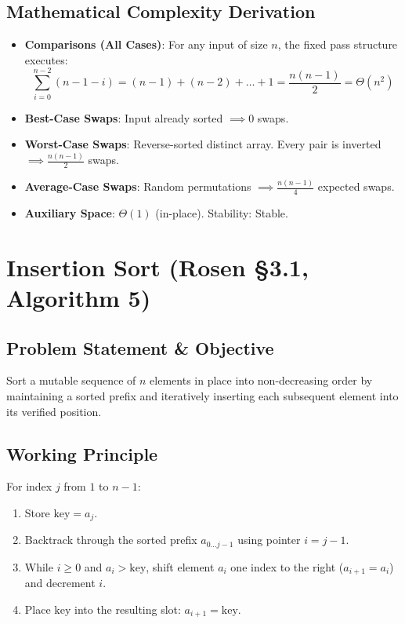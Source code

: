 \subsection{Mathematical Complexity Derivation}
\begin{itemize}
    \item \textbf{Comparisons (All Cases)}: For any input of size $n$, the fixed pass structure executes:
    $$\sum_{i=0}^{n-2} (n - 1 - i) = (n - 1) + (n - 2) + \dots + 1 = \frac{n(n - 1)}{2} = \Theta(n^2)$$
    \item \textbf{Best-Case Swaps}: Input already sorted $\implies 0$ swaps.
    \item \textbf{Worst-Case Swaps}: Reverse-sorted distinct array. Every pair is inverted $\implies \frac{n(n-1)}{2}$ swaps.
    \item \textbf{Average-Case Swaps}: Random permutations $\implies \frac{n(n-1)}{4}$ expected swaps.
    \item \textbf{Auxiliary Space}: $\Theta(1)$ (in-place). Stability: Stable.
\end{itemize}

\section{Insertion Sort (Rosen §3.1, Algorithm 5)}
\label{sec:insertion_sort}

\subsection{Problem Statement \& Objective}
Sort a mutable sequence of $n$ elements in place into non-decreasing order by maintaining a sorted prefix and iteratively inserting each subsequent element into its verified position.

\subsection{Working Principle}
For index $j$ from $1$ to $n-1$:
\begin{enumerate}
    \item Store $\text{key} = a_j$.
    \item Backtrack through the sorted prefix $a_{0 \dots j-1}$ using pointer $i = j - 1$.
    \item While $i \ge 0$ and $a_i > \text{key}$, shift element $a_i$ one index to the right ($a_{i+1} = a_i$) and decrement $i$.
    \item Place $\text{key}$ into the resulting slot: $a_{i+1} = \text{key}$.
\end{enumerate}

